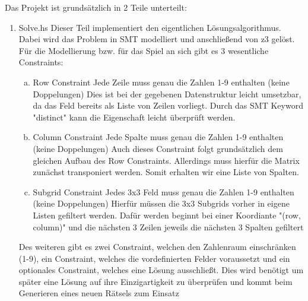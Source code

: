 Das Projekt ist grundsätzlich in 2 Teile unterteilt:
\begin{enumerate}[(1)]
    \item Solve.hs \newline
    Dieser Teil implementiert den eigentlichen Lösungsalgorithmus. Dabei wird das Problem in SMT modelliert und anschließend von z3 gelöst. Für die Modellierung bzw. für das Spiel an sich gibt es 3 wesentliche Constraints:
        \begin{enumerate}[(a)]
            \item Row Constraint \newline
            Jede Zeile muss genau die Zahlen 1-9 enthalten (keine Doppelungen)\newline
            Dies ist bei der gegebenen Datenstruktur leicht umsetzbar, da das Feld bereits als Liste von Zeilen vorliegt. Durch das SMT Keyword "distinct" kann die Eigenschaft leicht überprüft werden.
            \item Column Constraint \newline
            Jede Spalte muss genau die Zahlen 1-9 enthalten (keine Doppelungen) \newline
            Auch dieses Constraint folgt grundsätzlich dem gleichen Aufbau des Row Constraints. Allerdings muss hierfür die Matrix zunächst transponiert werden. Somit erhalten wir eine Liste von Spalten.
            \item Subgrid Constraint \newline
            Jedes 3x3 Feld muss genau die Zahlen 1-9 enthalten (keine Doppelungen) \newline
            Hierfür müssen die 3x3 Subgrids vorher in eigene Listen gefiltert werden. Dafür werden beginnt bei einer Koordiante "(row, column)" und die nächsten 3 Zeilen jeweils die nächsten 3 Spalten gefiltert
        \end{enumerate}

    Des weiteren gibt es zwei Constraint, welchen den Zahlenraum einschränken (1-9), ein Constraint, welches die vordefinierten Felder voraussetzt und ein optionales Constraint, welches eine Lösung ausschließt. Dies wird benötigt um später eine Lösung auf ihre Einzigartigkeit zu überprüfen und kommt beim Generieren eines neuen Rätsels zum Einsatz


\end{enumerate}
